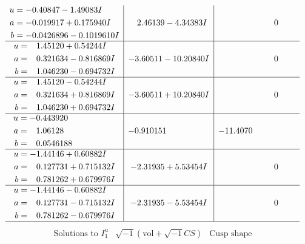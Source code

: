 \documentclass[1p]{elsarticle_modified}
\theoremstyle{definition}
\newcommand{\I}{\sqrt{-1}}
\begin{document}
$$\begin{array}{c|c|c}
\begin{aligned}
u &= -0.40847 - 1.49083 I \\
a &= -0.019917 + 0.175940 I \\
b &= -0.0426896 - 0.1019610 I\end{aligned}
 & \phantom{-}2.46139 - 4.34383 I & \phantom{-0.000000 } 0 \\ \hline\begin{aligned}
u &= \phantom{-}1.45120 + 0.54244 I \\
a &= \phantom{-}0.321634 - 0.816869 I \\
b &= \phantom{-}1.046230 - 0.694732 I\end{aligned}
 & -3.60511 - 10.20840 I & \phantom{-0.000000 } 0 \\ \hline\begin{aligned}
u &= \phantom{-}1.45120 - 0.54244 I \\
a &= \phantom{-}0.321634 + 0.816869 I \\
b &= \phantom{-}1.046230 + 0.694732 I\end{aligned}
 & -3.60511 + 10.20840 I & \phantom{-0.000000 } 0 \\ \hline\begin{aligned}
u &= -0.443920\phantom{ +0.000000I} \\
a &= \phantom{-}1.06128\phantom{ +0.000000I} \\
b &= \phantom{-}0.0546188\phantom{ +0.000000I}\end{aligned}
 & -0.910151\phantom{ +0.000000I} & -11.4070\phantom{ +0.000000I} \\ \hline\begin{aligned}
u &= -1.44146 + 0.60882 I \\
a &= \phantom{-}0.127731 + 0.715132 I \\
b &= \phantom{-}0.781262 + 0.679976 I\end{aligned}
 & -2.31935 + 5.53454 I & \phantom{-0.000000 } 0 \\ \hline\begin{aligned}
u &= -1.44146 - 0.60882 I \\
a &= \phantom{-}0.127731 - 0.715132 I \\
b &= \phantom{-}0.781262 - 0.679976 I\end{aligned}
 & -2.31935 - 5.53454 I & \phantom{-0.000000 } 0\\
 \hline 
 \end{array}$$\newpage$$\begin{array}{c|c|c}  
\text{Solutions to }I^u_{1}& \I (\text{vol} + \sqrt{-1}CS) & \text{Cusp shape}\\

\end{array}$$
\end{document}
